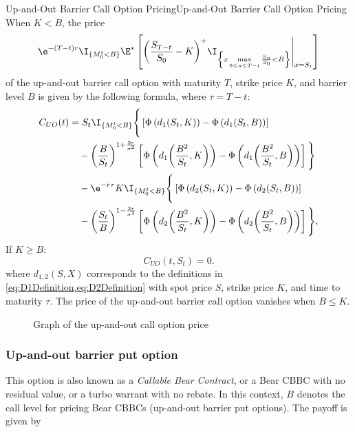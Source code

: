 \begin{prop}{Up-and-Out Barrier Call Option Pricing}{Up-and-Out Barrier Call Option Pricing}
	When \(K < B\), the price
	\begin{equation}
		\e^{-(T-t)r} \I_{\{M_0^t < B\}} \E^* \left[ {\left( \frac{S_{T-t}}{S_0} - K \right)}^+ \I_{\left\{ x \max\limits_{0 \le u \le T-t} \frac{S_u}{S_0} < B \right\}} \Bigg|_{x=S_t} \right]
	\end{equation}
	of the up-and-out barrier call option with maturity \(T\), strike price \(K\), and barrier level \(B\) is given by the following formula, where \(\tau = T-t\):
	\begin{align}
		C_{UO}(t) & = S_t \I_{\{M_0^t < B\}} \Bigg\{ \left[ \Phi \left( d_1(S_t, K) \right) - \Phi \left( d_1(S_t, B) \right) \right] \nonumber                                                                                   \\
		          & \quad - {\left( \frac{B}{S_t} \right)}^{1+\frac{2r}{\sigma^2}} \left[ \Phi \left( d_1{\left(\frac{B^2}{S_t}, K\right)} \right) - \Phi \left( d_1{\left(\frac{B^2}{S_t}, B\right)} \right) \right] \Bigg\} \nonumber \\
		          & \quad - \e^{-r\tau} K \I_{\{M_0^t < B\}} \Bigg\{ \left[ \Phi \left( d_2(S_t, K) \right) - \Phi \left( d_2(S_t, B) \right) \right] \nonumber                                                                   \\
		          & \quad - {\left( \frac{S_t}{B} \right)}^{1-\frac{2r}{\sigma^2}} \left[ \Phi \left( d_2{\left(\frac{B^2}{S_t}, K\right)} \right) - \Phi \left( d_2{\left(\frac{B^2}{S_t}, B\right)} \right) \right] \Bigg\},
	\end{align}
	If \(K \ge B\):
	\begin{equation}
		C_{UO}(t, S_t) = 0.
	\end{equation}
	where \(d_{1,2}(S, X)\) corresponds to the definitions in \cref{eq:D1Definition,eq:D2Definition} with spot price \(S\), strike price \(K\), and time to maturity \(\tau\). The price of the up-and-out barrier call option vanishes when \(B \le K\).
\end{prop}

\begin{figure}[H]
	\centering
	
	\caption{Graph of the up-and-out call option price}\label{fig:upAndOutCallBarrierSurface}
\end{figure}

\clearpage
\subsubsection{Up-and-out barrier put option}
This option is also known as a \textit{Callable Bear Contract}, or a Bear CBBC with no residual value, or a turbo warrant with no rebate. In this context, \(B\) denotes the call level for pricing Bear CBBCs (up-and-out barrier put options). The payoff is given by

